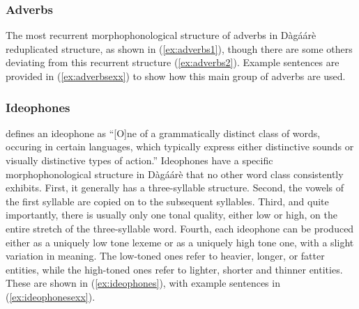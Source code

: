\begin{refsection}
\subsubsection{Adverbs}
The most recurrent morphophonological structure of adverbs in Dàgáárè
reduplicated structure, as shown in (\ref{ex:adverbs1}), though there are some others deviating from this
recurrent structure (\ref{ex:adverbs2}). Example sentences are provided in (\ref{ex:adverbsexx}) to show how this main
group of adverbs are used.

\ea {}
\z\z

\ea \label{ex:adverbsexx} 
 \z\z

\subsubsection{Ideophones}
\citet[131--132]{Trask1993} defines an ideophone as ``[O]ne of a grammatically distinct
class of words, occuring in certain languages, which typically express either distinctive
sounds or visually distinctive types of action.'' Ideophones have a specific morphophonological structure in Dàgáárè that no other word class consistently exhibits.
First, it generally has a three-syllable structure. Second, the vowels of the first syllable are
copied on to the subsequent syllables. Third, and quite importantly, there is usually only one
tonal quality, either low or high, on the entire stretch of the three-syllable word. Fourth, each
ideophone can be produced either as a uniquely low tone lexeme or as a uniquely high tone
one, with a slight variation in meaning. The low-toned ones refer to heavier, longer, or fatter
entities, while the high-toned ones refer to lighter, shorter and thinner entities. These are
shown in (\ref{ex:ideophones}), with example sentences in (\ref{ex:ideophonesexx}).


\end{refsection}
